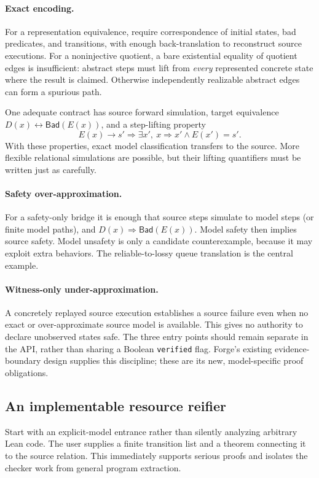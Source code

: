 \documentclass[11pt,a4paper]{article}
\theoremstyle{definition}
\newcommand{\Bad}{\mathsf{Bad}}
\newcommand{\code}[1]{\texttt{#1}}
\begin{document}
\paragraph{Exact encoding.}
For a representation equivalence, require correspondence of initial states,
bad predicates, and transitions, with enough back-translation to reconstruct
source executions. For a noninjective quotient, a bare existential equality
of quotient edges is insufficient: abstract steps must lift from \emph{every}
represented concrete state where the result is claimed. Otherwise independently
realizable abstract edges can form a spurious path.

One adequate contract has source forward simulation, target equivalence
$D(x)\leftrightarrow\Bad(E(x))$, and a step-lifting property
\[
 E(x)\to s'\Longrightarrow
 \exists x',\ x\Rightarrow x'\land E(x')=s'.
\]
With these properties, exact model classification transfers to the source.
More flexible relational simulations are possible, but their lifting
quantifiers must be written just as carefully.

\paragraph{Safety over-approximation.}
For a safety-only bridge it is enough that source steps simulate to model
steps (or finite model paths), and $D(x)\Rightarrow\Bad(E(x))$.
Model safety then implies source safety. Model unsafety is only a candidate
counterexample, because it may exploit extra behaviors. The reliable-to-lossy
queue translation is the central example.

\paragraph{Witness-only under-approximation.}
A concretely replayed source execution establishes a source failure even when
no exact or over-approximate source model is available. This gives no authority
to declare unobserved states safe. The three entry points should remain
separate in the API, rather than sharing a Boolean \code{verified} flag.
Forge's existing evidence-boundary design supplies this discipline; these
are its new, model-specific proof obligations.\cite{forgeideas}

\subsection{An implementable resource reifier}
Start with an explicit-model entrance rather than silently analyzing arbitrary
Lean code. The user supplies a finite transition list and a theorem connecting
it to the source relation. This immediately supports serious proofs and
isolates the checker work from general program extraction.
\end{document}

